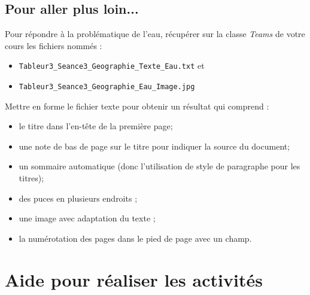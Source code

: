 



\subsection{Pour aller plus loin...}

Pour répondre à la problématique de l'eau, récupérer sur la classe \emph{Teams} de votre cours les fichiers nommés :
\begin{itemize}
\item \texttt{Tableur3\_Seance3\_Geographie\_Texte\_Eau.txt} et
\item \texttt{Tableur3\_Seance3\_Geographie\_Eau\_Image.jpg}
\end{itemize}

\vspace{6pt}

Mettre en forme le fichier texte pour obtenir un résultat qui comprend :
\begin{itemize}
\item le titre dans l'en-tête de la première page;
\item une note de bas de page sur le titre pour indiquer la source du document;
\item un sommaire automatique (donc l'utilisation de style de paragraphe pour les titres);
\item des puces en plusieurs endroits ;
\item une image avec adaptation du texte ;
\item la numérotation des pages dans le pied de page avec un champ.
\end{itemize}


\vspace{-4em}







%
%
%
%

\pagebreak

\section{Aide pour réaliser les activités}\label{AideTableur03}

